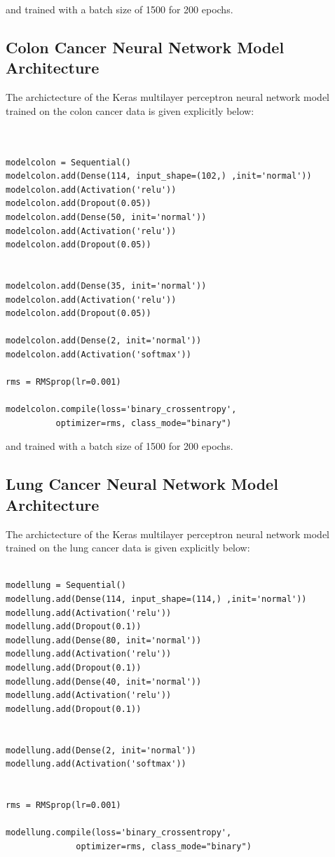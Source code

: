 \documentclass[10pt,letterpaper]{article}
\begin{document}
and trained with a batch size of 1500 for 200 epochs.

\subsection*{Colon Cancer Neural Network Model Architecture}
\label{subsec:colonnn}

The archictecture of the Keras multilayer perceptron neural network model 
trained on the colon cancer data is given explicitly below:

\begin{verbatim}


modelcolon = Sequential()
modelcolon.add(Dense(114, input_shape=(102,) ,init='normal'))
modelcolon.add(Activation('relu'))
modelcolon.add(Dropout(0.05))
modelcolon.add(Dense(50, init='normal'))
modelcolon.add(Activation('relu'))
modelcolon.add(Dropout(0.05))


modelcolon.add(Dense(35, init='normal'))
modelcolon.add(Activation('relu'))
modelcolon.add(Dropout(0.05))

modelcolon.add(Dense(2, init='normal'))
modelcolon.add(Activation('softmax'))

rms = RMSprop(lr=0.001)

modelcolon.compile(loss='binary_crossentropy',
          optimizer=rms, class_mode="binary")

\end{verbatim}

and trained with a batch size of 1500 for 200 epochs.


\subsection*{Lung Cancer Neural Network Model Architecture}
\label{subsec:lungnn}


The archictecture of the Keras multilayer perceptron neural network model 
trained on the lung cancer data is given explicitly below:

\begin{verbatim}

modellung = Sequential()
modellung.add(Dense(114, input_shape=(114,) ,init='normal'))
modellung.add(Activation('relu'))
modellung.add(Dropout(0.1))
modellung.add(Dense(80, init='normal'))
modellung.add(Activation('relu'))
modellung.add(Dropout(0.1))
modellung.add(Dense(40, init='normal'))
modellung.add(Activation('relu'))
modellung.add(Dropout(0.1))


modellung.add(Dense(2, init='normal'))
modellung.add(Activation('softmax'))


rms = RMSprop(lr=0.001)

modellung.compile(loss='binary_crossentropy',
              optimizer=rms, class_mode="binary")

\end{verbatim}
\end{document}

